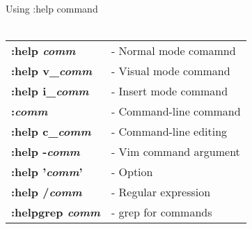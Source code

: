 \documentclass[a4paper,8pt]{extarticle}
\begin{document}
    \begin{multicols*}{3}

        \noindent
        {\LARGE Using :help command}\\\\
        \begin{tabular}{ l l }
            \textbf{:help \textsl{comm}}        &    - Normal mode comamnd                                  \\
            \textbf{:help v\_\textsl{comm}}     &    - Visual mode command                                  \\
            \textbf{:help i\_\textsl{comm}}     &    - Insert mode command                                  \\
            \textbf{:\textsl{comm}}             &    - Command-line command                                 \\
            \textbf{:help c\_\textsl{comm}}     &    - Command-line editing                                 \\
            \textbf{:help -\textsl{comm}}       &    - Vim command argument                                 \\
            \textbf{:help '\textsl{comm}'}      &    - Option                                               \\
            \textbf{:help /\textsl{comm}}       &    - Regular expression                                   \\
            \textbf{:helpgrep \textsl{comm}}    &    - grep for commands                                    \\
        \end{tabular}


\end{multicols*}
\end{document}
